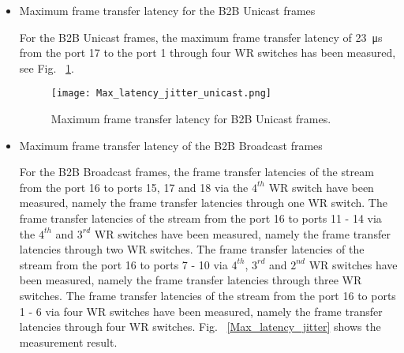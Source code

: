 \begin{itemize}
    \item Maximum frame transfer latency for the B2B Unicast frames

For the B2B Unicast frames, the maximum frame transfer latency of \SI{23}{\us} from the port 17 to the port 1 through four WR switches has been measured, see Fig. ~\ref{Max_latency_jitter_unicast}. 

%
%

\begin{figure}[H]
   \centering   
   \texttt{[image: Max\_latency\_jitter\_unicast.png]}
   \caption{Maximum frame transfer latency for B2B Unicast frames.}
   \label{Max_latency_jitter_unicast}
\end{figure}

    \item Maximum frame transfer latency of the B2B Broadcast frames

For the B2B Broadcast frames, the frame transfer latencies of the stream from the port 16 to ports 15, 17 and 18 via the $4^{th}$ WR switch have been measured, namely the frame transfer latencies through one WR switch. The frame transfer latencies of the stream from the port 16 to ports 11 - 14 via the $4^{th}$ and $3^{rd}$ WR switches have been measured, namely the frame transfer latencies through two WR switches. The frame transfer latencies of the stream from the port 16 to ports 7 - 10 via $4^{th}$, $3^{rd}$ and $2^{nd}$ WR switches have been measured, namely the frame transfer latencies through three WR switches. The frame transfer latencies of the stream from the port 16 to ports 1 - 6 via four WR switches have been measured, namely the frame transfer latencies through four WR switches. Fig. ~\ref{Max_latency_jitter} shows the measurement result.
  

\end{itemize}
